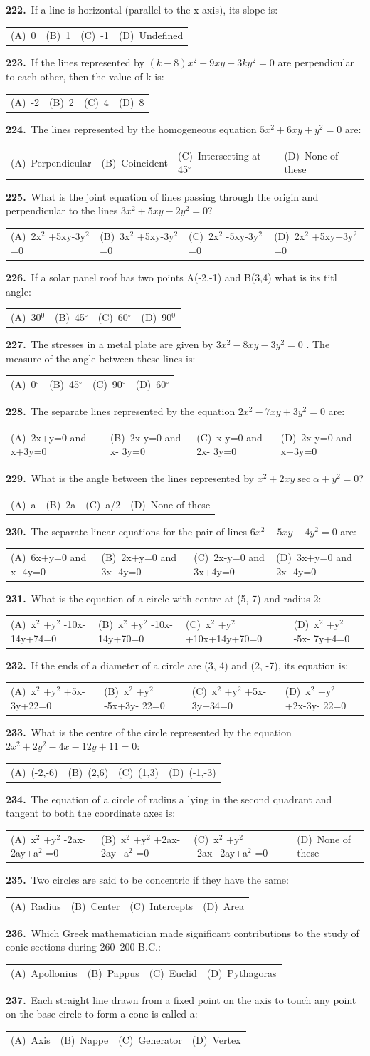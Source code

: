 \documentclass[11pt,a4paper]{article}
\makeatletter
\newcommand{\mcq}[6]{%
  \Needspace{4\baselineskip}%
  \par\medskip\noindent\textbf{#1.}\ #2\par\nopagebreak
  \noindent\begin{tabularx}{\linewidth}{@{\hspace{1.5em}}*{4}{>{\raggedright\arraybackslash}X}@{}}
    (A)~#3 & (B)~#4 & (C)~#5 & (D)~#6
  \end{tabularx}\par}
\makeatother
\begin{document}
\mcq{222}{If a line is horizontal (parallel to the x-axis), its slope is:}{0}{1}{-1}{Undefined}
\mcq{223}{If the lines represented by $(k-8)x^{2}-9xy+3ky^{2}=0$ are perpendicular to each other, then the value of k is:}{-2}{2}{4}{8}
\mcq{224}{The lines represented by the homogeneous equation $5x^{2}+6xy+y^{2}=0$ are:}{Perpendicular}{Coincident}{Intersecting at 45$^{\circ}$}{None of these}
\mcq{225}{What is the joint equation of lines passing through the origin and perpendicular to the lines $3x^{2}+5xy-2y^{2}=0$?}{2x$^{2}$ +5xy-3y$^{2}$ =0}{3x$^{2}$ +5xy-3y$^{2}$ =0}{2x$^{2}$ -5xy-3y$^{2}$ =0}{2x$^{2}$ +5xy+3y$^{2}$ =0}
\mcq{226}{If a solar panel roof has two points A(-2,-1) and B(3,4) what is its titl angle:}{30$^{0}$}{45$^{\circ}$}{60$^{\circ}$}{90$^{0}$}
\mcq{227}{The stresses in a metal plate are given by $3x^{2}-8xy-3y^{2}=0$ . The measure of the angle between these lines is:}{0$^{\circ}$}{45$^{\circ}$}{90$^{\circ}$}{60$^{\circ}$}
\mcq{228}{The separate lines represented by the equation $2x^{2}-7xy+3y^{2}=0$ are:}{2x+y=0 and x+3y=0}{2x-y=0 and x- 3y=0}{x-y=0 and 2x- 3y=0}{2x-y=0 and x+3y=0}
\mcq{229}{What is the angle between the lines represented by $x^{2}+2xy\sec\alpha+y^{2}=0$?}{a}{2a}{a/2}{None of these}
\mcq{230}{The separate linear equations for the pair of lines $6x^{2}-5xy-4y^{2}=0$ are:}{6x+y=0 and x- 4y=0}{2x+y=0 and 3x- 4y=0}{2x-y=0 and 3x+4y=0}{3x+y=0 and 2x- 4y=0}
\mcq{231}{What is the equation of a circle with centre at (5, 7) and radius 2:}{x$^{2}$ +y$^{2}$ -10x- 14y+74=0}{x$^{2}$ +y$^{2}$ -10x- 14y+70=0}{x$^{2}$ +y$^{2}$ +10x+14y+70=0}{x$^{2}$ +y$^{2}$ -5x- 7y+4=0}
\mcq{232}{If the ends of a diameter of a circle are (3, 4) and (2, -7), its equation is:}{x$^{2}$ +y$^{2}$ +5x- 3y+22=0}{x$^{2}$ +y$^{2}$ -5x+3y- 22=0}{x$^{2}$ +y$^{2}$ +5x- 3y+34=0}{x$^{2}$ +y$^{2}$ +2x-3y- 22=0}
\mcq{233}{What is the centre of the circle represented by the equation $2x^{2}+2y^{2}-4x-12y+11=0$:}{(-2,-6)}{(2,6)}{(1,3)}{(-1,-3)}
\mcq{234}{The equation of a circle of radius a lying in the second quadrant and tangent to both the coordinate axes is:}{x$^{2}$ +y$^{2}$ -2ax- 2ay+a$^{2}$ =0}{x$^{2}$ +y$^{2}$ +2ax- 2ay+a$^{2}$ =0}{x$^{2}$ +y$^{2}$ -2ax+2ay+a$^{2}$ =0}{None of these}
\mcq{235}{Two circles are said to be concentric if they have the same:}{Radius}{Center}{Intercepts}{Area}
\mcq{236}{Which Greek mathematician made significant contributions to the study of conic sections during 260–200 B.C.:}{Apollonius}{Pappus}{Euclid}{Pythagoras}
\mcq{237}{Each straight line drawn from a fixed point on the axis to touch any point on the base circle to form a cone is called a:}{Axis}{Nappe}{Generator}{Vertex}
\end{document}
